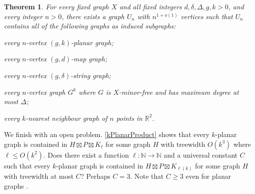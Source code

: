 \documentclass{patmorin}
\theoremstyle{plain}
\newtheorem{thm}{Theorem}
\theoremstyle{definition}
\newcommand{\note}[2]{\noindent{\color{red}[#1:~#2]}}
\renewcommand{\geq}{\geqslant}
\renewcommand{\leq}{\leqslant}
\newcommand{\R}{\mathbb{R}}
\newcommand{\N}{\mathbb{N}}
\begin{document}
\begin{thm}
	\label{UniversalUniversal}
	For every fixed graph $X$ and all fixed integers $d,\delta,\Delta,g,k>0$, and every integer
	$n>0$, there exists a graph $U_n$ with $n^{1+o(1)}$ vertices such that
	$U_n$ contains all of the following graphs as induced subgraphs:
	\begin{compactitem}
		\item every $n$-vertex $(g,k)$-planar graph;
		\item every $n$-vertex $(g,d)$-map graph;
		\item every $n$-vertex $(g,\delta)$-string graph;
		\item every $n$-vertex graph $G^k$ where $G$ is $X$-minor-free and has maximum degree at most $\Delta$;
		\item every $k$-nearest neighbour graph of $n$ points in $\R^2$.
	\end{compactitem}
\end{thm}

We finish with an open problem. \cref{kPlanarProduct} shows that every $k$-planar graph is contained in $H\boxtimes P \boxtimes K_\ell$ for some graph $H$ with treewidth $O(k^3)$ where $\ell\leq O(k^2)$. Does there exist a function $\ell:\N\to\N$ and a universal constant $C$ such that every $k$-planar graph is contained in $H\boxtimes P \boxtimes K_{\ell(k)}$ for some graph $H$ with treewidth at most $C$?  Perhaps $C=3$. Note that $C\geq 3$ even for planar graphs \citep{DJMMUW20}.


   \let\oldthebibliography=\thebibliography
   \let\endoldthebibliography=\endthebibliography
   \renewenvironment{thebibliography}[1]{%
     \begin{oldthebibliography}{#1}%
       \setlength{\parskip}{0ex}%
       \setlength{\itemsep}{0ex}%
   }{\end{oldthebibliography}}
\end{document}
